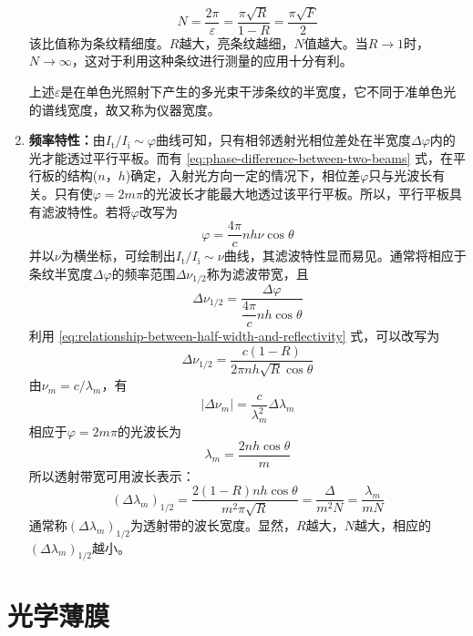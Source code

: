 \documentclass[cn,10pt,chinesefont=founder,math=mtpro2,cite=super,toc=onecol,twoside,openany]{elegantbook}
\begin{document}
\begin{enumerate}
\begin{equation}
	N=\frac{2\pi}{\varepsilon}=\frac{\pi\sqrt{R}}{1-R}=\frac{\pi\sqrt{F}}{2}
	\end{equation}
	该比值称为条纹精细度。$R$越大，亮条纹越细，$N$值越大。当$R\rightarrow1$时，$N\rightarrow\infty$，这对于利用这种条纹进行测量的应用十分有利。
	\begin{note}
		上述$\varepsilon$是在单色光照射下产生的多光束干涉条纹的半宽度，它不同于准单色光的谱线宽度，故又称为仪器宽度。
	\end{note}
	\item \textbf{频率特性：}由$I_{\mathrm{t}}/I_{\mathrm{i}}\sim\varphi$曲线可知，只有相邻透射光相位差处在半宽度$\Delta\varphi$内的光才能透过平行平板。而有 \eqref{eq:phase-difference-between-two-beams} 式，在平行板的结构($n$，$h$)确定，入射光方向一定的情况下，相位差$\varphi$只与光波长有关。只有使$\varphi=2m\pi$的光波长才能最大地透过该平行平板。所以，平行平板具有滤波特性。若将$\varphi$改写为
	\begin{equation}
	\varphi=\frac{4\pi}{c}nh\nu\cos\theta
	\end{equation}
	并以$\nu$为横坐标，可绘制出$I_{\mathrm{t}}/I_{\mathrm{i}}\sim\nu$曲线，其滤波特性显而易见。通常将相应于条纹半宽度$\Delta\varphi$的频率范围$\Delta\nu_{1/2}$称为滤波带宽，且
	\begin{equation}
	\Delta\nu_{1/2}=\frac{\Delta\varphi}{\dfrac{4\pi}{c}nh\cos\theta}
	\end{equation}
	利用 \eqref{eq:relationship-between-half-width-and-reflectivity} 式，可以改写为
	\begin{equation}
	\Delta\nu_{1/2}=\frac{c(1-R)}{2\pi nh\sqrt{R}\cos\theta}
	\end{equation}
	由$\nu_m=c/\lambda_m$，有
	\begin{equation}
	|\Delta\nu_m|=\frac{c}{\lambda^2_m}\Delta\lambda_m
	\end{equation}
	相应于$\varphi=2m\pi$的光波长为
	\begin{equation}
	\lambda_m=\frac{2nh\cos\theta}{m}
	\end{equation}
	所以透射带宽可用波长表示：
	\begin{equation}
	(\Delta\lambda_m)_{1/2}=\frac{2(1-R)nh\cos\theta}{m^2\pi\sqrt{R}}=\frac{\varDelta}{m^2N}=\frac{\lambda_m}{mN}
	\end{equation}
	通常称$(\Delta\lambda_m)_{1/2}$为透射带的波长宽度。显然，$R$越大，$N$越大，相应的$(\Delta\lambda_m)_{1/2}$越小。
\end{enumerate}

\section{光学薄膜}
\end{document}
